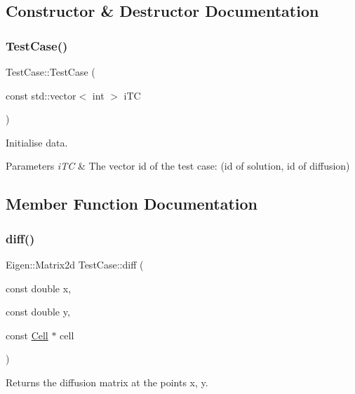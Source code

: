 \subsection{Constructor \& Destructor Documentation}
\mbox{\label{classTestCase_aa4ad29533416ee515205db87002a1bf1}} 
\subsubsection{\texorpdfstring{Test\+Case()}{TestCase()}}
{\footnotesize\ttfamily Test\+Case\+::\+Test\+Case (\begin{DoxyParamCaption}\item[{const std\+::vector$<$ int $>$}]{i\+TC }\end{DoxyParamCaption})}



Initialise data. 


\begin{DoxyParams}{Parameters}
{\em i\+TC} & The vector id of the test case\+: (id of solution, id of diffusion) \\
\hline
\end{DoxyParams}


\subsection{Member Function Documentation}
\mbox{\label{classTestCase_aaf745f4815ce0e9c16d8bded9f9b3596}} 
\subsubsection{\texorpdfstring{diff()}{diff()}}
{\footnotesize\ttfamily Eigen\+::\+Matrix2d Test\+Case\+::diff (\begin{DoxyParamCaption}\item[{const double}]{x,  }\item[{const double}]{y,  }\item[{const \hyperlink{classHArDCore2D_1_1Cell}{Cell} $\ast$}]{cell }\end{DoxyParamCaption})}



Returns the diffusion matrix at the points x, y. 


